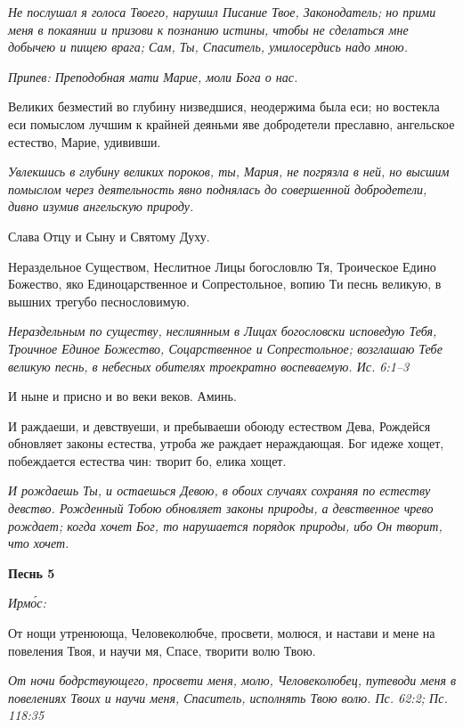 \itshape Не послушал я голоса Твоего, нарушил Писание Твое, Законодатель; но прими меня в покаянии и призови к познанию истины, чтобы не сделаться мне добычею и пищею врага; Сам, Ты, Спаситель, умилосердись надо мною.\normalfont{}


\itshape Припев:\normalfont{} Преподобная мати Марие, моли Бога о нас.


Великих безместий во глубину низведшися, неодержима была еси; но востекла еси помыслом лучшим к крайней деяньми яве добродетели преславно, ангельское естество, Марие, удививши.


\itshape Увлекшись в глубину великих пороков, ты, Мария, не погрязла в ней, но высшим помыслом через деятельность явно поднялась до совершенной добродетели, дивно изумив ангельскую природу.\normalfont{}


Слава Отцу и Сыну и Святому Духу.


Нераздельное Существом, Неслитное Лицы богословлю Тя, Троическое Едино Божество, яко Единоцарственное и Сопрестольное, вопию Ти песнь великую, в вышних трегубо песнословимую.


\itshape Нераздельным по существу, неслиянным в Лицах богословски исповедую Тебя, Троичное Единое Божество, Соцарственное и Сопрестольное; возглашаю Тебе великую песнь, в небесных обителях троекратно воспеваемую. Ис. 6:1–3\normalfont{}


И ныне и присно и во веки веков. Аминь.


И раждаеши, и девствуеши, и пребываеши обоюду естеством Дева, Рождейся обновляет законы естества, утроба же раждает нераждающая. Бог идеже хощет, побеждается естества чин: творит бо, елика хощет.


\itshape И рождаешь Ты, и остаешься Девою, в обоих случаях сохраняя по естеству девство. Рожденный Тобою обновляет законы природы, а девственное чрево рождает; когда хочет Бог, то нарушается порядок природы, ибо Он творит, что хочет.\normalfont{}





\bfseries Песнь 5\normalfont{}


\itshape Ирмо́с:\normalfont{}


От нощи утренююща, Человеколюбче, просвети, молюся, и настави и мене на повеления Твоя, и научи мя, Спасе, творити волю Твою.


\itshape От ночи бодрствующего, просвети меня, молю, Человеколюбец, путеводи меня в повелениях Твоих и научи меня, Спаситель, исполнять Твою волю. Пс. 62:2; Пс. 118:35\normalfont{}


